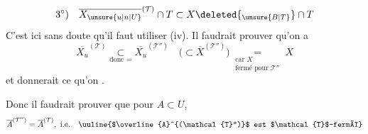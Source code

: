 \[
3^\circ)\quad\overline{X_{\unsure{u|n|U}}}^{(\mathcal{T})}\cap T\subset X\deleted{_{\unsure{B|T}}}\cap T
\]
C'est ici sans doute qu'il faut utiliser (iv). Il faudrait prouver qu'on a
\[
\overline{X_u}^{(\mathcal{T})}\underset{\text{donc }=}{\subset}\overline{X_u}^{(\mathcal{T}'')}
\quad\bigl(\subset\overline{X}^{(\mathcal{T}'')}\bigr)
\underset{\substack{\text{car }X\\\text{fermé pour }\mathcal{T}''}}{=}X
\]
et  donnerait ce qu'on .

Donc il faudrait prouver que pour $A\subset U$,
\[
\overline{A}^{(\mathcal{T}'')}=\overline{A}^{(\mathcal{T})},\ \text{i.e.}\quad
\text{\uuline{$\overline{A}^{(\mathcal{T}'')}$ est $\mathcal{T}$-fermé}}
\]

